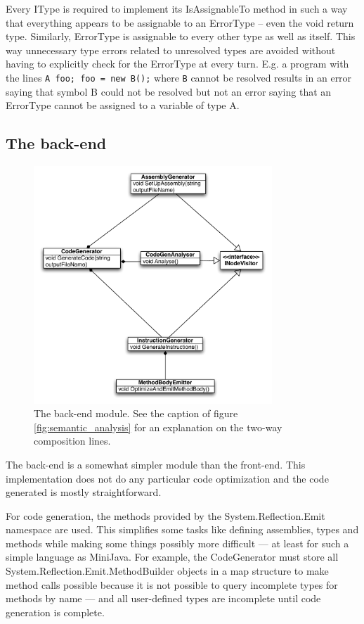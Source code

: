 \documentclass[a4paper,11pt]{article}
\begin{document}
Every IType is required to implement its IsAssignableTo method in such a way that everything appears to be assignable to an ErrorType -- even the void return type. Similarly, ErrorType is assignable to every other type as well as itself. This way unnecessary type errors related to unresolved types are avoided without having to explicitly check for the ErrorType at every turn. E.g. a program with the lines \verb,A foo; foo = new B();, where \verb,B, cannot be resolved results in an error saying that symbol B could not be resolved but not an error saying that an ErrorType cannot be assigned to a variable of type A.

\subsection{The back-end}

\begin{figure}[h!]
\centering
\includegraphics[width=0.8\textwidth]{backend.pdf}
\caption{The back-end module. See the caption of figure \ref{fig:semantic_analysis} for an explanation on the two-way composition lines.}
\end{figure}

The back-end is a somewhat simpler module than the front-end. This implementation does not do any particular code optimization and the code generated is mostly straightforward.

For code generation, the methods provided by the System.Reflection.Emit namespace are used. This simplifies some tasks like defining assemblies, types and methods while making some things possibly more difficult --- at least for such a simple language as MiniJava. For example, the CodeGenerator must store all System.Reflection.Emit.MethodBuilder objects in a map structure to make method calls possible because it is not possible to query incomplete types for methods by name --- and all user-defined types are incomplete until code generation is complete.
\end{document}
